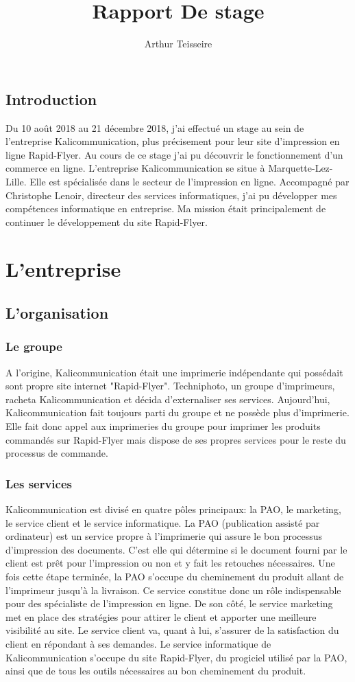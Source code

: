 \documentclass[a4paper]{report}
\title{Rapport De stage}
\author{Arthur Teisseire}
\begin{document}
\tableofcontents
\renewcommand{\thesection}{\arabic{section}}
\chapter*{Introduction}
Du 10 août 2018 au 21 décembre 2018, j'ai effectué un stage au sein de l'entreprise Kalicommunication, plus précisement pour leur site d'impression en ligne Rapid-Flyer. Au cours de ce stage j'ai pu découvrir le fonctionnement d'un commerce en ligne.\newline
L'entreprise Kalicommunication se situe à Marquette-Lez-Lille. Elle est spécialisée dans le secteur de l'impression en ligne.\newline
Accompagné par Christophe Lenoir, directeur des services informatiques, j'ai pu développer mes compétences informatique en entreprise. Ma mission était principalement de continuer le développement du site Rapid-Flyer.
\part{L'entreprise}
\chapter*{L'organisation}
\section{Le groupe}
A l'origine, Kalicommunication était une imprimerie indépendante qui possédait sont propre site internet "Rapid-Flyer". Techniphoto, un groupe d'imprimeurs, racheta Kalicommunication et décida d'externaliser ses services. Aujourd'hui, Kalicommunication fait toujours parti du groupe et ne possède plus d'imprimerie. Elle fait donc appel aux imprimeries du groupe pour imprimer les produits commandés sur Rapid-Flyer mais dispose de ses propres services pour le reste du processus de commande.
\section{Les services}
Kalicommunication est divisé en quatre pôles principaux: la PAO, le marketing, le service client et le service informatique.\newline
La PAO (publication assisté par ordinateur) est un service propre à l'imprimerie qui assure le bon processus d'impression des documents. C'est elle qui détermine si le document fourni par le client est prêt pour l'impression ou non et y fait les retouches nécessaires. Une fois cette étape terminée, la PAO s'occupe du cheminement du produit allant de l'imprimeur jusqu'à la livraison. Ce service constitue donc un rôle indispensable pour des spécialiste de l'impression en ligne.\newline
De son côté, le service marketing met en place des stratégies pour attirer le client et apporter une meilleure visibilité au site.\newline
Le service client va, quant à lui, s'assurer de la satisfaction du client en répondant à ses demandes.\newline
Le service informatique de Kalicommunication s'occupe du site Rapid-Flyer, du progiciel utilisé par la PAO, ainsi que de tous les outils nécessaires au bon cheminement du produit.
\end{document}
